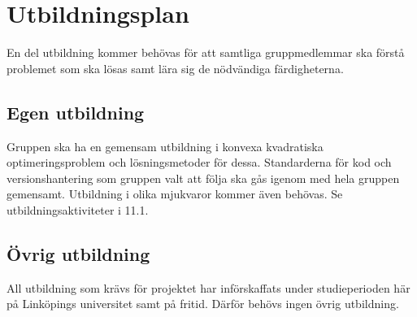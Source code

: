 \section{Utbildningsplan}
En del utbildning kommer behövas för att samtliga gruppmedlemmar ska förstå problemet som ska lösas samt lära sig de nödvändiga färdigheterna. 

\subsection{Egen utbildning}
Gruppen ska ha en gemensam utbildning i konvexa kvadratiska optimeringsproblem och lösningsmetoder för dessa. Standarderna för kod och versionshantering som gruppen valt att följa ska gås igenom med hela gruppen gemensamt. Utbildning i olika mjukvaror kommer även behövas. Se utbildningsaktiviteter i 11.1. 

\subsection{Övrig utbildning}
All utbildning som krävs för projektet har införskaffats under studieperioden här på Linköpings universitet samt på fritid. Därför behövs ingen övrig utbildning.